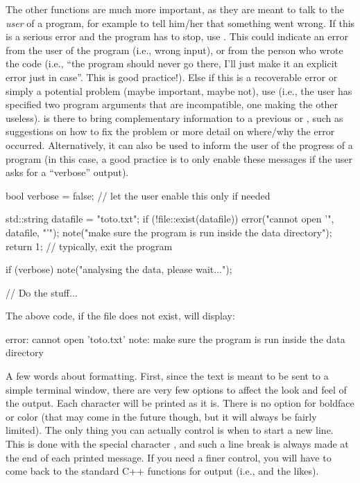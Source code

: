 The other functions are much more important, as they are meant to talk to the \emph{user} of a program, for example to tell him/her that something went wrong. If this is a serious error and the program has to stop, use . This could indicate an error from the user of the program (i.e., wrong input), or from the person who wrote the code (i.e., ``the program should never go there, I'll just make it an explicit error just in case''. This is good practice!). Else if this is a recoverable error or simply a potential problem (maybe important, maybe not), use  (i.e., the user has specified two program arguments that are incompatible, one making the other useless).  is there to bring complementary information to a previous  or , such as suggestions on how to fix the problem or more detail on where/why the error occurred. Alternatively, it can also be used to inform the user of the progress of a program (in this case, a good practice is to only enable these messages if the user asks for a ``verbose'' output).
\begin{cppcode}
bool verbose = false; // let the user enable this only if needed

std::string datafile = "toto.txt";
if (!file::exist(datafile)) {
    error("cannot open '", datafile, "'");
    note("make sure the program is run inside the data directory");
    return 1; // typically, exit the program
}

if (verbose) {
    note("analysing the data, please wait...");
}

// Do the stuff...
\end{cppcode}

The above code, if the file does not exist, will display:
\begin{bashcode}
error: cannot open 'toto.txt'
note: make sure the program is run inside the data directory
\end{bashcode}

A few words about formatting. First, since the text is meant to be sent to a simple terminal window, there are very few options to affect the look and feel of the output. Each character will be printed as it is. There is no option for boldface or color (that may come in the future though, but it will always be fairly limited). The only thing you can actually control is when to start a new line. This is done with the special character , and such a line break is always made at the end of each printed message. If you need a finer control, you will have to come back to the standard C++ functions for output (i.e.,  and the likes).


